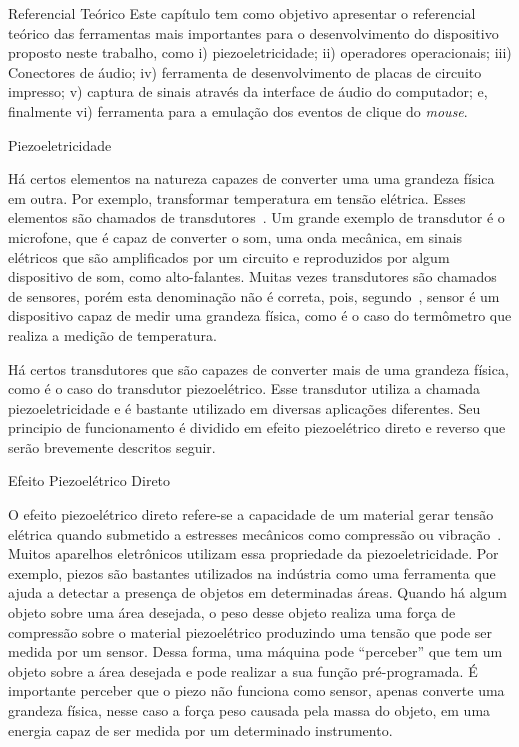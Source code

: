 \begin{chapter}{Referencial Teórico}
Este capítulo tem como objetivo apresentar o referencial teórico das ferramentas
mais importantes para o desenvolvimento do dispositivo proposto neste trabalho,
como i) piezoeletricidade; ii) operadores operacionais; iii) Conectores de
áudio; iv) ferramenta de desenvolvimento de placas de circuito impresso; v) captura de sinais
através da interface de áudio do computador; e, finalmente vi) ferramenta para a
emulação dos eventos de clique do \textit{mouse}.

\begin{section}{Piezoeletricidade}

Há certos elementos na natureza capazes de converter uma uma grandeza física em
outra. Por exemplo, transformar temperatura em tensão elétrica. Esses
elementos são chamados de transdutores~\cite{william}. Um grande exemplo de
transdutor é o microfone, que é capaz de converter o som, uma onda mecânica, em
sinais elétricos que são amplificados por um circuito e reproduzidos por algum
dispositivo de som, como alto-falantes. Muitas vezes transdutores são chamados
de sensores, porém esta denominação não é correta, pois, segundo~\cite{usher},
sensor é um dispositivo capaz de medir uma grandeza física, como é o caso do
termômetro que realiza a medição de temperatura. 

Há certos transdutores que são capazes de converter mais de uma grandeza física,
como é o caso do transdutor piezoelétrico. Esse transdutor utiliza a chamada
piezoeletricidade e é bastante utilizado em diversas aplicações diferentes. Seu
principio de funcionamento é dividido em efeito piezoelétrico direto e reverso
que serão brevemente descritos seguir.

\begin{subsection}{Efeito Piezoelétrico Direto}

O efeito piezoelétrico direto refere-se a capacidade de um material gerar tensão
elétrica quando submetido a estresses mecânicos como compressão ou
vibração~\cite{jaffe2012piezoelectric}. Muitos aparelhos eletrônicos utilizam
essa propriedade da piezoeletricidade. Por exemplo, piezos são bastantes
utilizados na indústria como uma ferramenta que ajuda a detectar a presença de
objetos em determinadas áreas. Quando há algum objeto sobre uma área desejada,
o peso desse objeto realiza uma força de compressão sobre o material
piezoelétrico produzindo uma tensão que pode ser medida por um sensor. Dessa
forma, uma máquina pode ``perceber'' que tem um objeto sobre a área desejada e
pode realizar a sua função pré-programada. É importante perceber que o piezo não
funciona como sensor, apenas converte uma grandeza física, nesse caso a força
peso causada pela massa do objeto, em uma energia capaz de ser medida por um
determinado instrumento.
  

\end{subsection}
\end{section}
\end{chapter}
